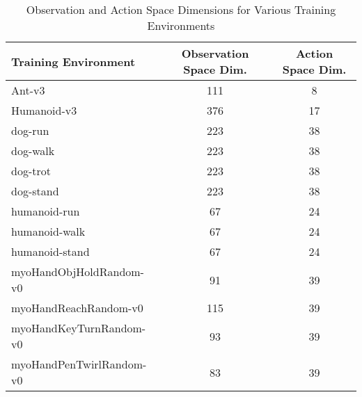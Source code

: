 \begin{table}[h!]
    \centering
    \begin{tabular}{lcc}
        \toprule
        \textbf{Training Environment} & \textbf{Observation Space Dim.} & \textbf{Action Space Dim.} \\
        \midrule
        Ant-v3                        & 111 & 8  \\
        Humanoid-v3                   & 376 & 17 \\
        dog-run                       & 223 & 38 \\
        dog-walk                      & 223 & 38 \\
        dog-trot                      & 223 & 38 \\
        dog-stand                     & 223 & 38 \\
        humanoid-run                  & 67  & 24 \\
        humanoid-walk                 & 67  & 24 \\
        humanoid-stand                & 67  & 24 \\
        myoHandObjHoldRandom-v0       & 91  & 39  \\
        myoHandReachRandom-v0         & 115 & 39  \\
        myoHandKeyTurnRandom-v0       & 93  & 39  \\
        myoHandPenTwirlRandom-v0      & 83  & 39  \\
        \bottomrule
    \end{tabular}
    \caption{Observation and Action Space Dimensions for Various Training Environments}
    \label{tab::appendix::env_dimensions}
\end{table}

